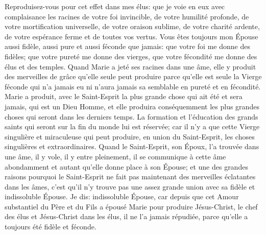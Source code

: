 Reproduisez-vous pour cet effet dans mes élus: que je voie en eux avec complaisance les racines de votre foi
invincible, de votre humilité profonde, de votre mortification universelle, de votre oraison sublime, de votre charité
ardente, de votre espérance ferme et de toutes vos vertus. Vous êtes toujours mon Épouse aussi fidèle, aussi pure
et aussi féconde que jamais: que votre foi me donne des fidèles; que votre pureté me donne des vierges, que
votre fécondité me donne des élus et des temples.
 Quand Marie a jeté ses racines dans une âme, elle y produit des merveilles de grâce qu'elle seule peut
produire parce qu'elle est seule la Vierge féconde qui n'a jamais eu ni n'aura jamais sa semblable en pureté et en
fécondité.
Marie a produit, avec le Saint-Esprit la plus grande chose qui ait été et sera jamais, qui est un Dieu Homme, et elle
produira conséquemment les plus grandes choses qui seront dans les derniers temps. La formation et l'éducation
des grands saints qui seront sur la fin du monde lui est réservée; car il n'y a que cette Vierge singulière et
miraculeuse qui peut produire, en union du Saint-Esprit, les choses singulières et extraordinaires.
 Quand le Saint-Esprit, son Époux, l'a trouvée dans une âme, il y vole, il y entre pleinement, il se communique
à cette âme abondamment et autant qu'elle donne place à son Épouse; et une des grandes raisons pourquoi le
Saint-Esprit ne fait pas maintenant des merveilles éclatantes dans les âmes, c'est qu'il n'y trouve pas une assez
grande union avec sa fidèle et indissoluble Épouse. Je dis: indissoluble Épouse, car depuis que cet Amour
substantiel du Père et du Fils a épousé Marie pour produire Jésus-Christ, le chef des élus et Jésus-Christ dans les
élus, il ne l'a jamais répudiée, parce qu'elle a toujours été fidèle et féconde.
